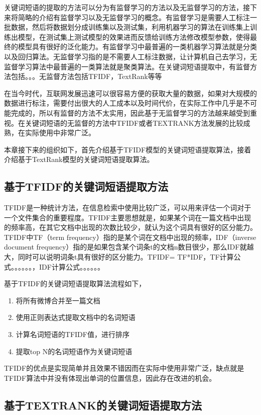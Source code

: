 \documentclass[master]{njuthesis}
\begin{document}
    关键词短语的提取的方法可以分为有监督学习的方法以及无监督学习的方法，接下来将简略的介绍有监督学习以及无监督学习的概念。有监督学习是需要人工标注一批数据，然后将数据划分成训练集以及测试集，利用机器学习的算法在训练集上训练出模型，在测试集上测试模型的效果进而反馈给训练方法修改模型参数，使得最终的模型具有很好的泛化能力。有监督学习中最普遍的一类机器学习算法就是分类以及回归算法。无监督学习指的是不需要人工标注数据，让计算机自己去学习，无监督学习算法中最普遍的一类算法就是聚类算法。在关键词短语提取中，有监督方法包括。。。无监督方法包括TFIDF，TextRank等等

    在当今时代，互联网发展迅速可以很容易方便的获取大量的数据，如果对大规模的数据进行标注，需要付出很大的人工成本以及时间代价，在实际工作中几乎是不可能完成的，所以有监督的方法不太实用，因此基于无监督学习的方法越来越受到重视。在关键词短语的无监督的方法中TFIDF或者TEXTRANK方法发展的比较成熟，在实际使用中非常广泛。
    
    本章接下来的组织如下，首先介绍基于TFIDF模型的关键词短语提取算法，接着介绍基于TextRank模型的关键词短语提取算法。

\subsection{基于TFIDF的关键词短语提取方法}

    TFIDF是一种统计方法，在信息检索中使用比较广泛，可以用来评估一个词对于一个文件集合的重要程度。TFIDF主要思想就是，如果某个词在一篇文档中出现的频率高，在其它文档中出现的次数比较少，就认为这个词具有很好的区分能力。TFIDF中TF（term frequency）指的是某个词在文档中出现的频率，IDF（inverse document frequency）指的是如果包含某个词条t的文档n数目很少，那么IDF就越大，同时可以说明词条t具有很好的区分能力。TFIDF= TF*IDF，TF计算公式。。。。。。，IDF计算公式。。。。。。
    
    基于TFIDF的关键词短语提取算法流程如下，
    \begin{enumerate}
      \item 将所有微博合并至一篇文档
      \item 使用正则表达式提取文档中的名词短语
      \item 计算名词短语的TFIDF值，进行排序
      \item 提取top N的名词短语作为关键词短语
    \end{enumerate}
      
    TFIDF的优点是实现简单并且效果不错因而在实际中使用非常广泛，缺点就是TFIDF算法中并没有体现出单词的位置信息，因此存在改进的机会。

\subsection{基于TEXTRANK的关键词短语提取方法}
\end{document}
